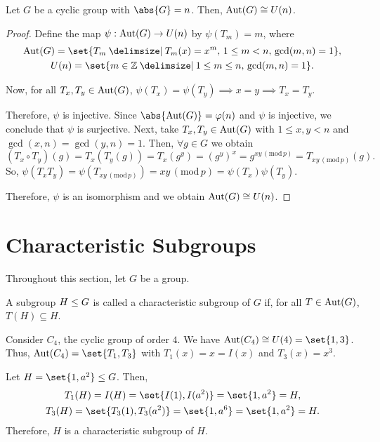 \documentclass[11pt]{penrose}
\begin{document}
\begin{nthm}
    Let $G$ be a cyclic group with $\abs{G} = n$. Then, $\operatorname{Aut}(G) \mathrel{\cong} U(n)$.
\end{nthm}
\begin{proof}
    Define the map $\psi : \operatorname{Aut}(G) \to U(n)$ by $\psi(T_{m}) = m$, where
    \begin{gather*}
        \Aut(G) = \set{T_{m} \st T_{m}(x) = x^{m},\, 1 \leq m < n,\, \gcd(m,n) = 1},\\
        U(n) = \set{m \in \Z \st 1 \leq m \leq n,\, \gcd(m, n) = 1}.
    \end{gather*}

    Now, for all $T_{x}, T_{y} \in \operatorname{Aut}(G)$, $\psi(T_{x}) = \psi(T_{y}) \implies x = y \implies T_{x} = T_{y}$.

    Therefore, $\psi$ is injective. Since $\abs{\Aut(G)} = \varphi(n)$ and $\psi$ is injective, we conclude that $\psi$ is surjective. Next, take $T_{x}, T_{y} \in \operatorname{Aut}(G)$ with $1 \leq x, y < n$ and $\gcd(x,n) = \gcd(y,n) = 1$. Then, $\forall g \in G$ we obtain
    \begin{equation*}
        (T_{x} \circ T_{y})(g)
        = T_{x}( T_{y}(g) )
        = T_{x}( g^{y} )
        = (g^{y})^{x}
        = g^{xy \,(\mathrm{mod}\, p)}
        = T_{xy \,(\mathrm{mod}\, p)}(g).
    \end{equation*}
    So, $\psi(T_{x} T_{y}) = \psi( T_{xy \,(\mathrm{mod}\, p)} ) = xy \,(\mathrm{mod}\, p) = \psi(T_{x}) \psi(T_{y})$.

    Therefore, $\psi$ is an isomorphism and we obtain $\operatorname{Aut}(G) \mathrel{\cong} U(n)$.
\end{proof}

\section{Characteristic Subgroups}
Throughout this section, let $G$ be a group.

\begin{ndfn}
    A subgroup $H \mathrel{\leq} G$ is called a characteristic subgroup of $G$ if, for all $T \in \operatorname{Aut}(G)$, $T(H) \subseteq H$.
\end{ndfn}

\begin{negg}
    Consider $C_{4}$, the cyclic group of order $4$. We have $\Aut(C_{4}) \isom U(4) = \set{1,3}$. Thus, $\Aut(C_{4}) = \set{T_{1}, T_{3}}$ with $T_{1}(x) = x = I(x)$ and $T_{3}(x) = x^{3}$.

    Let $H = \set{1, a^{2}} \subgroup G$. Then,
    \begin{gather*}
        T_{1}(H) = I(H) = \set{I(1), I(a^{2})} = \set{1, a^{2}} = H,\\
        T_{3}(H) = \set{T_{3}(1), T_{3}(a^{2})} = \set{1, a^{6}} = \set{1, a^{2}} = H.
    \end{gather*}
    Therefore, $H$ is a characteristic subgroup of $H$.
\end{negg}
\end{document}
